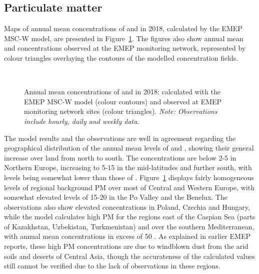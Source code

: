 \subsection{Particulate matter} 
\label{subs:PMstatus}

Maps of annual mean concentrations of \PM[10] and \PM[2.5] in 2018,
calculated by the EMEP MSC-W model, are presented in
Figure~\ref{fig:PMin2018}. The figures also show annual mean \PM[10]
and \PM[2.5] concentrations observed at the EMEP monitoring network,
represented by colour triangles overlaying the contours of the
modelled concentration fields.

\begin{figure}[H]
  \\
  \vspace{0.5cm}
\caption{Annual mean concentrations of \PM[10] and \PM[2.5] in 2018:
  calculated with the EMEP MSC-W model (colour contours) and observed
  at EMEP monitoring network sites (colour triangles). \textit{Note:
    Observations include hourly, daily and weekly data.}}
\label{fig:PMin2018}
\end{figure}


The model results and the observations are well in agreement
regarding the geographical distribution of the annual mean levels of
\PM[10] and \PM[2.5], showing their general increase over land from
north to south. The concentrations are below 2-5 \ug in Northern
Europe, increasing to 5-15 \ug in the mid-latitudes and further south,
with \PM[2.5] levels being somewhat lower than those of
\PM[10]. Figure~\ref{fig:PMin2018} displays fairly homogeneous levels
of regional background PM over most of Central and Western Europe,
with somewhat elevated \PM[10] levels of 15-20 \ug in the Po Valley and
the Benelux. The observations also show elevated \PM[10] concentrations in Poland, Czechia and Hungary, while
the model calculates high PM for the regions east of the Caspian Sea
(parts of Kazakhstan, Uzbekistan, Turkmenistan) and over the southern
Mediterranean, with annual mean concentrations in excess of 50
\ug. As explained in earlier EMEP reports, these high PM
concentrations are due to windblown dust from the arid soils and
deserts of Central Asia, though the accurateness of the calculated
values still cannot be verified due to the lack of
observations in these regions.

